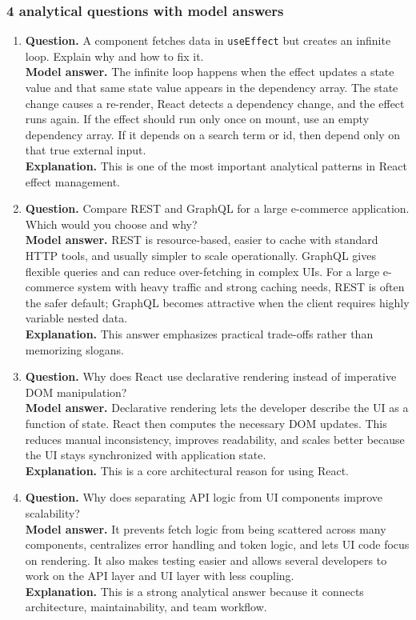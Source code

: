 \documentclass[11pt,a4paper]{article}
\begin{document}
\subsubsection*{4 analytical questions with model answers}

\begin{enumerate}
  \item \textbf{Question.} A component fetches data in \texttt{useEffect} but creates an infinite loop. Explain why and how to fix it.\\
  \textbf{Model answer.} The infinite loop happens when the effect updates a state value and that same state value appears in the dependency array. The state change causes a re-render, React detects a dependency change, and the effect runs again. If the effect should run only once on mount, use an empty dependency array. If it depends on a search term or id, then depend only on that true external input.\\
  \textbf{Explanation.} This is one of the most important analytical patterns in React effect management.

  \item \textbf{Question.} Compare REST and GraphQL for a large e-commerce application. Which would you choose and why?\\
  \textbf{Model answer.} REST is resource-based, easier to cache with standard HTTP tools, and usually simpler to scale operationally. GraphQL gives flexible queries and can reduce over-fetching in complex UIs. For a large e-commerce system with heavy traffic and strong caching needs, REST is often the safer default; GraphQL becomes attractive when the client requires highly variable nested data.\\
  \textbf{Explanation.} This answer emphasizes practical trade-offs rather than memorizing slogans.

  \item \textbf{Question.} Why does React use declarative rendering instead of imperative DOM manipulation?\\
  \textbf{Model answer.} Declarative rendering lets the developer describe the UI as a function of state. React then computes the necessary DOM updates. This reduces manual inconsistency, improves readability, and scales better because the UI stays synchronized with application state.\\
  \textbf{Explanation.} This is a core architectural reason for using React.

  \item \textbf{Question.} Why does separating API logic from UI components improve scalability?\\
  \textbf{Model answer.} It prevents fetch logic from being scattered across many components, centralizes error handling and token logic, and lets UI code focus on rendering. It also makes testing easier and allows several developers to work on the API layer and UI layer with less coupling.\\
  \textbf{Explanation.} This is a strong analytical answer because it connects architecture, maintainability, and team workflow.
\end{enumerate}
\end{document}
